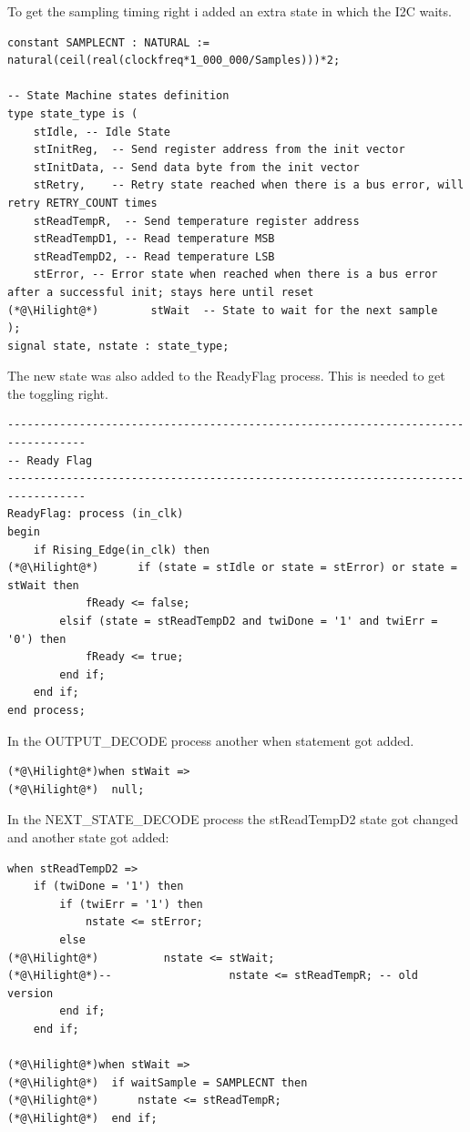 \documentclass[%
	a4paper,
]
{article}
\begin{document}
To get the sampling timing right i added an extra state in which the I2C waits.

\lstset{style=vhdl, firstnumber=101}
\begin{lstlisting}
constant SAMPLECNT : NATURAL := natural(ceil(real(clockfreq*1_000_000/Samples)))*2;

-- State Machine states definition
type state_type is (
	stIdle, -- Idle State
	stInitReg,  -- Send register address from the init vector
	stInitData, -- Send data byte from the init vector
	stRetry,    -- Retry state reached when there is a bus error, will retry RETRY_COUNT times
	stReadTempR,  -- Send temperature register address
	stReadTempD1, -- Read temperature MSB
	stReadTempD2, -- Read temperature LSB
	stError, -- Error state when reached when there is a bus error after a successful init; stays here until reset
(*@\Hilight@*)        stWait  -- State to wait for the next sample
);
signal state, nstate : state_type;
\end{lstlisting}

The new state was also added to the ReadyFlag process. This is needed to get the toggling right.

\begin{lstlisting}
----------------------------------------------------------------------------------
-- Ready Flag
----------------------------------------------------------------------------------  
ReadyFlag: process (in_clk)
begin
	if Rising_Edge(in_clk) then
(*@\Hilight@*)		if (state = stIdle or state = stError) or state = stWait then
			fReady <= false;
		elsif (state = stReadTempD2 and twiDone = '1' and twiErr = '0') then
			fReady <= true;
		end if;
	end if;
end process;
\end{lstlisting}

In the OUTPUT\_DECODE process another when statement got added.
\begin{lstlisting}
(*@\Hilight@*)when stWait =>
(*@\Hilight@*)	null;
\end{lstlisting}

In the NEXT\_STATE\_DECODE process the stReadTempD2 state got changed and another state got added:
\begin{lstlisting}
when stReadTempD2 =>
	if (twiDone = '1') then
		if (twiErr = '1') then
			nstate <= stError;
		else
(*@\Hilight@*)			nstate <= stWait;
(*@\Hilight@*)--                  nstate <= stReadTempR; -- old version
		end if;
	end if;
 
(*@\Hilight@*)when stWait =>
(*@\Hilight@*)	if waitSample = SAMPLECNT then
(*@\Hilight@*)		nstate <= stReadTempR;
(*@\Hilight@*)	end if;
\end{lstlisting}
\end{document}
